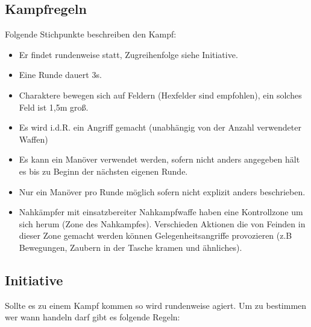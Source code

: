 \documentclass{article}
\begin{document}
\begin{center}
\subsection{Kampfregeln}
\end{center}

Folgende Stichpunkte beschreiben den Kampf:

\begin{itemize}
\item Er findet rundenweise statt, Zugreihenfolge siehe Initiative.
\item Eine Runde dauert 3s.
\item Charaktere bewegen sich auf Feldern (Hexfelder sind empfohlen), ein solches Feld ist 1,5m groß.
\item Es wird i.d.R. ein Angriff gemacht (unabhängig von der Anzahl verwendeter Waffen)
\item Es kann ein Manöver verwendet werden, sofern nicht anders angegeben hält es bis zu Beginn der nächsten eigenen Runde.
\item Nur ein Manöver pro Runde möglich sofern nicht explizit anders beschrieben.
\item Nahkämpfer mit einsatzbereiter Nahkampfwaffe haben eine Kontrollzone um sich herum (Zone des Nahkampfes). Verschieden Aktionen die von Feinden in dieser Zone gemacht werden können Gelegenheitsangriffe provozieren (z.B Bewegungen, Zaubern in der Tasche kramen und ähnliches).
\end{itemize}

\begin{center}
\subsection{Initiative}
\end{center}

Sollte es zu einem Kampf kommen so wird rundenweise agiert. Um zu bestimmen wer wann handeln darf gibt es folgende
Regeln:
\end{document}
